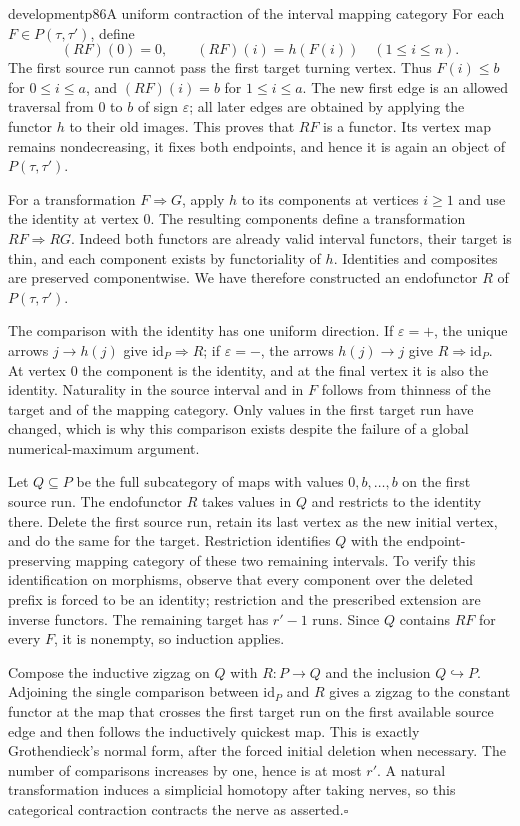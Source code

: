\begin{dcomment}{development}{p86}{A uniform contraction of the interval mapping category}
For each $F\in P(\tau,\tau')$, define
\[
 (RF)(0)=0,\qquad (RF)(i)=h(F(i))\quad(1\leq i\leq n).
\]
The first source run cannot pass the first target turning vertex. Thus $F(i)\leq b$ for $0\leq i\leq a$, and $(RF)(i)=b$ for $1\leq i\leq a$. The new first edge is an allowed traversal from $0$ to $b$ of sign $\varepsilon$; all later edges are obtained by applying the functor $h$ to their old images. This proves that $RF$ is a functor. Its vertex map remains nondecreasing, it fixes both endpoints, and hence it is again an object of $P(\tau,\tau')$.

For a transformation $F\Rightarrow G$, apply $h$ to its components at vertices $i\geq1$ and use the identity at vertex $0$. The resulting components define a transformation $RF\Rightarrow RG$. Indeed both functors are already valid interval functors, their target is thin, and each component exists by functoriality of $h$. Identities and composites are preserved componentwise. We have therefore constructed an endofunctor $R$ of $P(\tau,\tau')$.

The comparison with the identity has one uniform direction. If $\varepsilon=+$, the unique arrows $j\to h(j)$ give $\mathrm{id}_P\Rightarrow R$; if $\varepsilon=-$, the arrows $h(j)\to j$ give $R\Rightarrow\mathrm{id}_P$. At vertex $0$ the component is the identity, and at the final vertex it is also the identity. Naturality in the source interval and in $F$ follows from thinness of the target and of the mapping category. Only values in the first target run have changed, which is why this comparison exists despite the failure of a global numerical-maximum argument.

Let $Q\subseteq P$ be the full subcategory of maps with values $0,b,\ldots,b$ on the first source run. The endofunctor $R$ takes values in $Q$ and restricts to the identity there. Delete the first source run, retain its last vertex as the new initial vertex, and do the same for the target. Restriction identifies $Q$ with the endpoint-preserving mapping category of these two remaining intervals. To verify this identification on morphisms, observe that every component over the deleted prefix is forced to be an identity; restriction and the prescribed extension are inverse functors. The remaining target has $r'-1$ runs. Since $Q$ contains $RF$ for every $F$, it is nonempty, so induction applies.

Compose the inductive zigzag on $Q$ with $R:P\to Q$ and the inclusion $Q\hookrightarrow P$. Adjoining the single comparison between $\mathrm{id}_P$ and $R$ gives a zigzag to the constant functor at the map that crosses the first target run on the first available source edge and then follows the inductively quickest map. This is exactly Grothendieck's normal form, after the forced initial deletion when necessary. The number of comparisons increases by one, hence is at most $r'$. A natural transformation induces a simplicial homotopy after taking nerves, so this categorical contraction contracts the nerve as asserted.\hfill$\square$


\end{dcomment}
